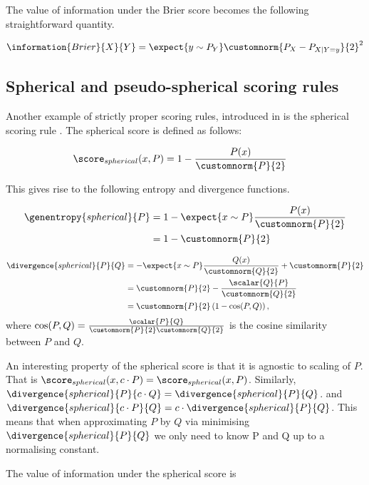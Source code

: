 The value of information under the Brier score becomes the following straightforward quantity.

\begin{align}
	\information{Brier}{X}{Y} &= \expect{y \sim P_{Y}} \customnorm{P_X - P_{X\vert Y=y}}{2}^2\\
\end{align}

\subsection{Spherical and pseudo-spherical scoring rules}
Another example of strictly proper scoring rules, introduced in \citep{Good1971} is the spherical scoring rule \citep{Dawid2007,Dawid2012}. The spherical score is defined as follows:

\begin{align}
	\score_{spherical}(x,P) &= 1 -\frac{P(x)}{\customnorm{P}{2}}
\end{align}

This gives rise to the following entropy and divergence functions.

\begin{align}
	\genentropy{spherical}{P} &= 1 -\expect{x \sim P}\frac{P(x)}{\customnorm{P}{2}}\\
		&= 1 -\customnorm{P}{2}
\end{align}

\begin{align}
	\divergence{spherical}{P}{Q} &= -\expect{x \sim P}\frac{Q(x)}{\customnorm{Q}{2}} + \customnorm{P}{2}\\
		&= \customnorm{P}{2} - \frac{\scalar{Q}{P}}{\customnorm{Q}{2}}\\
		&= \customnorm{P}{2}\left( 1 - \cos(P,Q) \right),
\end{align}
where $\cos(P,Q) = \frac{\scalar{P}{Q}}{\customnorm{P}{2}\customnorm{Q}{2}}$ is the cosine similarity between $P$ and $Q$.

An interesting property of the spherical score is that it is agnostic to scaling of $P$. That is $\score_{spherical}(x,c\cdot P) = \score_{spherical}(x,P) $. Similarly, $\divergence{spherical}{P}{c\cdot Q} = \divergence{spherical}{P}{Q}$. and $\divergence{spherical}{c\cdot P}{Q} = c \cdot \divergence{spherical}{P}{Q}$. This means that when approximating $P$ by $Q$ via minimising $\divergence{spherical}{P}{Q}$ we only need to know P and Q up to a normalising constant.

The value of information under the spherical score is

